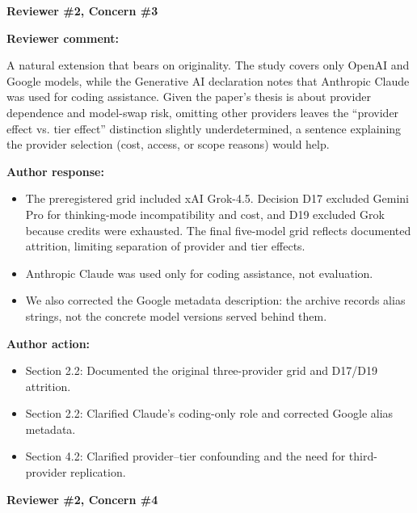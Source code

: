 \documentclass[11pt]{article}
\newcommand{\rvcomment}[1]{{\color{ReviewerGreen}#1}}
\newcommand{\concern}[1]{\textbf{\color{ReviewerGreen}#1}}
\begin{document}
\vspace{12pt}
\concern{Reviewer \#2, Concern \#3}

\concern{Reviewer comment:}

\rvcomment{A natural extension that bears on originality. The study covers only OpenAI and Google models, while the Generative AI declaration notes that Anthropic Claude was used for coding assistance. Given the paper's thesis is about provider dependence and model-swap risk, omitting other providers leaves the ``provider effect vs. tier effect'' distinction slightly underdetermined, a sentence explaining the provider selection (cost, access, or scope reasons) would help.}

\textbf{Author response:}

\begin{itemize}

\item The preregistered grid included xAI Grok-4.5. Decision D17 excluded Gemini Pro for thinking-mode incompatibility and cost, and D19 excluded Grok because credits were exhausted. The final five-model grid reflects documented attrition, limiting separation of provider and tier effects.

\item Anthropic Claude was used only for coding assistance, not evaluation.

\item We also corrected the Google metadata description: the archive records alias strings, not the concrete model versions served behind them.

\end{itemize}

\textbf{Author action:}

\begin{itemize}

\item Section 2.2: Documented the original three-provider grid and D17/D19 attrition.

\item Section 2.2: Clarified Claude's coding-only role and corrected Google alias metadata.

\item Section 4.2: Clarified provider--tier confounding and the need for third-provider replication.

\end{itemize}

\vspace{12pt}
\concern{Reviewer \#2, Concern \#4}
\end{document}
